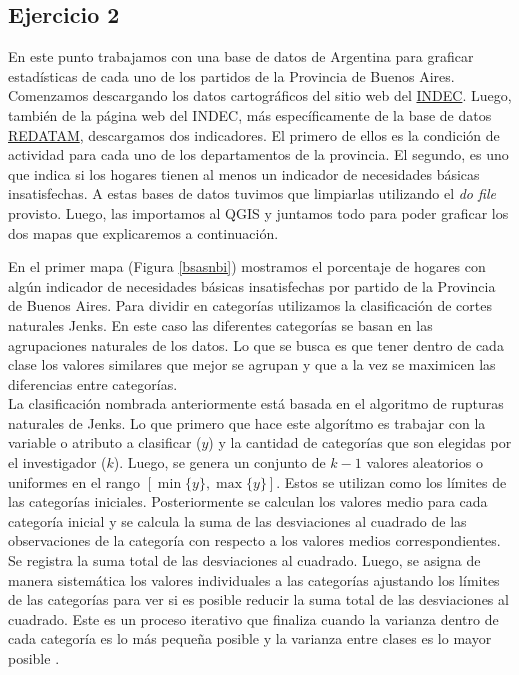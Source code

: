 \documentclass[12pt]{article}
\begin{document}
\subsection*{Ejercicio 2}

En este punto trabajamos con una base de datos de Argentina para graficar estadísticas de cada uno de los partidos de la Provincia de Buenos Aires. Comenzamos descargando los datos cartográficos del sitio web del \href{https://www.indec.gob.ar/indec/web/Institucional-Indec-Codgeo}{INDEC}. Luego, tambi\'en de la p\'agina web del INDEC, m\'as espec\'ificamente de la base de datos \href{https://redatam.indec.gob.ar/argbin/RpWebEngine.exe/PortalAction?&MODE=MAIN&BASE=CPV2010A&MAIN=WebServerMain.inl&_ga=2.11555124.1497521223.1592814315-345592181.1592814315}{REDATAM}, descargamos dos indicadores. El primero de ellos es la condici\'on de actividad para cada uno de los departamentos de la provincia. El segundo, es uno que indica si los hogares tienen al menos un indicador de necesidades b\'asicas insatisfechas. A estas bases de datos tuvimos que limpiarlas utilizando el \textit{do file} provisto. Luego, las importamos al QGIS y juntamos todo para poder graficar los dos mapas que explicaremos a continuaci\'on.
    

En el primer mapa (Figura \ref{bsasnbi}) mostramos el porcentaje de hogares con algún indicador de necesidades básicas insatisfechas por partido de la Provincia de Buenos Aires. Para dividir en categorías utilizamos la clasificación de cortes naturales Jenks. En este caso las diferentes categorías se basan en las agrupaciones naturales de los datos. Lo que se busca es que tener dentro de cada clase los valores similares que mejor se agrupan y que a la vez se maximicen las diferencias entre categorías. \\


La clasificación nombrada anteriormente está basada en el algoritmo de rupturas naturales de Jenks. Lo que primero que hace este algorítmo es trabajar con la variable o atributo a clasificar ($y$) y la cantidad de categorías que son elegidas por el investigador ($k$). Luego, se genera un conjunto de $k-1$ valores aleatorios o uniformes en el rango $[\min \{y\}, \max\{y\}]$. Estos se utilizan como los límites de las categorías iniciales. Posteriormente se calculan los valores medio para cada categoría inicial y se calcula la suma de las desviaciones al cuadrado de las observaciones de la categoría con respecto a los valores medios correspondientes. Se registra la suma total de las desviaciones al cuadrado. Luego, se asigna de manera sistemática los valores individuales a las categorías ajustando los límites de las categorías para ver si es posible reducir la suma total de las desviaciones al cuadrado. Este es un proceso iterativo que finaliza cuando la varianza dentro de cada categoría es lo más pequeña posible y la varianza entre clases es lo mayor posible \citep{de2007geospatial}. 
\end{document}
